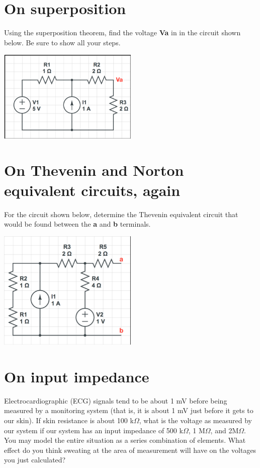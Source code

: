\documentclass[11pt]{book}
\begin{document}
\section{On superposition}
Using the superposition theorem, find the voltage \color{red} \textbf{Va} \color{black} in in the circuit shown below. Be sure to show all your steps.

\begin{center}
	\includegraphics[width=0.5\textwidth]{figures/hw2.05.png}
\end{center}

\section{On Thevenin and Norton equivalent circuits, again}
For the circuit shown below, determine the Thevenin equivalent circuit that would be found between the \color{red}\textbf{a} \color{black} and \color{red} \textbf{b} \color{black} terminals.
\begin{center}
	\includegraphics[width=0.5\textwidth]{figures/hw2.06.png}
\end{center}

\section{On input impedance}
Electrocardiographic (ECG) signals tend to be about 1 mV before being measured by a monitoring system (that is, it is about 1 mV just before it gets to our skin). If skin resistance is about 100 k$\Omega$, what is the voltage as measured by our system if our system has an input impedance of 500 k$\Omega$, 1 M$\Omega$, and 2M$\Omega$. You may model the entire situation as a series combination of elements. What effect do you think sweating at the area of measurement will have on the voltages you just calculated?
\end{document}
